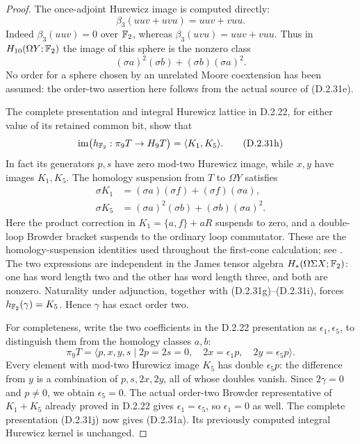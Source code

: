 \begin{proof}
The once-adjoint Hurewicz image is computed directly:
\[
 \beta_3(uuv+uvu)=uuv+vuu.
 \tag{D.2.31f}
\]
Indeed $\beta_3(uuv)=0$ over $\mathbb F_2$, whereas
$\beta_3(uvu)=uuv+vuu$. Thus in $H_{10}(\Omega Y;\mathbb F_2)$
the image of this sphere is the nonzero class
\[
      (\sigma a)^2(\sigma b)+(\sigma b)(\sigma a)^2.
      \tag{D.2.31g}
\]
No order for a sphere chosen by an unrelated Moore coextension
has been assumed: the order-two assertion here follows from
the actual source of \textup{(D.2.31e)}.

The complete presentation and integral Hurewicz lattice in
\textup{D.2.22}, for either value of its retained common bit,
show that
\[
 \operatorname{im}\bigl(h_{\mathbb F_2}:\pi_9T\to H_9T\bigr)
       =\langle K_1,K_5\rangle.
 \tag{D.2.31h}
\]
In fact its generators $p,s$ have zero mod-two Hurewicz
image, while $x,y$ have images $K_1,K_5$. The homology
suspension from $T$ to $\Omega Y$ satisfies
\[
\begin{aligned}
 \sigma K_1&=(\sigma a)(\sigma f)+(\sigma f)(\sigma a),\\
 \sigma K_5&=(\sigma a)^2(\sigma b)+(\sigma b)(\sigma a)^2.
\end{aligned}
 \tag{D.2.31i}
\]
Here the product correction in $K_1=\{a,f\}+aR$ suspends
to zero, and a double-loop Browder bracket suspends to the
ordinary loop commutator. These are the homology-suspension
identities used throughout the first-cone calculation; see
\cite[Chapter~III, Theorem~1.4]{I_CohenLadaMay1976}.
The two expressions are independent in the James tensor
algebra $H_*(\Omega\Sigma X;\mathbb F_2)$: one has word length
two and the other has word length three, and both are nonzero.
Naturality under adjunction, together with
\textup{(D.2.31g)--(D.2.31i)}, forces
$h_{\mathbb F_2}(\gamma)=K_5$. Hence $\gamma$ has exact order two.

For completeness, write the two coefficients in the
\textup{D.2.22} presentation as $\epsilon_1,\epsilon_5$,
to distinguish them from the homology classes $a,b$:
\[
 \pi_9T=\langle p,x,y,s\mid
       2p=2s=0,\quad2x=\epsilon_1p,\quad
       2y=\epsilon_5p\rangle.
 \tag{D.2.31j}
\]
Every element with mod-two Hurewicz image $K_5$ has double
$\epsilon_5p$: the difference from $y$ is a combination
of $p,s,2x,2y$, all of whose doubles vanish.
Since $2\gamma=0$ and $p\ne0$, we obtain
$\epsilon_5=0$. The actual order-two Browder representative
of $K_1+K_5$ already proved in \textup{D.2.22} gives
$\epsilon_1=\epsilon_5$, so $\epsilon_1=0$ as well.
The complete presentation \textup{(D.2.31j)} now gives
\textup{(D.2.31a)}. Its previously computed integral
Hurewicz kernel is unchanged.
\end{proof}
